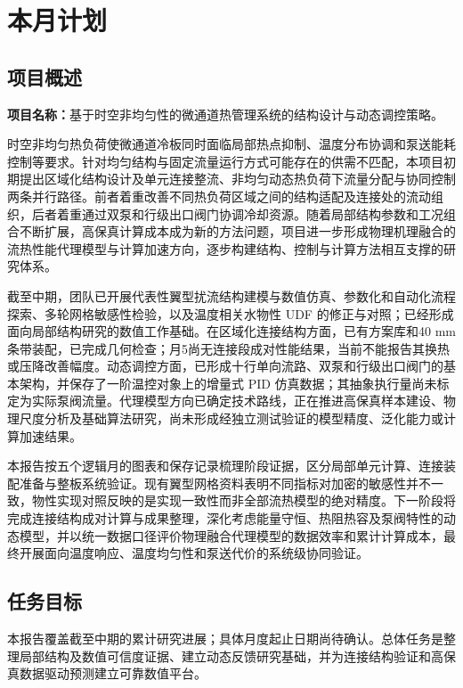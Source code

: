 \documentclass[stage2,UTF8,fontset=fandol]{ydzjreport}
\begin{document}
\makestagetwohead
\section{本月计划}

\subsection{项目概述}

\textbf{项目名称：}基于时空非均匀性的微通道热管理系统的结构设计与动态调控策略。




时空非均匀热负荷使微通道冷板同时面临局部热点抑制、温度分布协调和泵送能耗控制等要求。针对均匀结构与固定流量运行方式可能存在的供需不匹配，本项目初期提出区域化结构设计及单元连接整流、非均匀动态热负荷下流量分配与协同控制两条并行路径。前者着重改善不同热负荷区域之间的结构适配及连接处的流动组织，后者着重通过双泵和行级出口阀门协调冷却资源。随着局部结构参数和工况组合不断扩展，高保真计算成本成为新的方法问题，项目进一步形成物理机理融合的流热性能代理模型与计算加速方向，逐步构建结构、控制与计算方法相互支撑的研究体系。

截至中期，团队已开展代表性翼型扰流结构建模与数值仿真、参数化和自动化流程探索、多轮网格敏感性检验，以及温度相关水物性 UDF 的修正与对照；已经形成面向局部结构研究的数值工作基础。在区域化连接结构方面，已有方案库和40 mm条带装配，已完成几何检查；月5尚无连接段成对性能结果，当前不能报告其换热或压降改善幅度。动态调控方面，已形成十行单向流路、双泵和行级出口阀门的基本架构，并保存了一阶温控对象上的增量式 PID 仿真数据；其抽象执行量尚未标定为实际泵阀流量。代理模型方向已确定技术路线，正在推进高保真样本建设、物理尺度分析及基础算法研究，尚未形成经独立测试验证的模型精度、泛化能力或计算加速结果。

本报告按五个逻辑月的图表和保存记录梳理阶段证据，区分局部单元计算、连接装配准备与整板系统验证。现有翼型网格资料表明不同指标对加密的敏感性并不一致，物性实现对照反映的是实现一致性而非全部流热模型的绝对精度。下一阶段将完成连接结构成对计算与成果整理，深化考虑能量守恒、热阻热容及泵阀特性的动态模型，并以统一数据口径评价物理融合代理模型的数据效率和累计计算成本，最终开展面向温度响应、温度均匀性和泵送代价的系统级协同验证。


\subsection{任务目标}
本报告覆盖截至中期的累计研究进展；具体月度起止日期尚待确认。总体任务是整理局部结构及数值可信度证据、建立动态反馈研究基础，并为连接结构验证和高保真数据驱动预测建立可靠数值平台。
\end{document}
